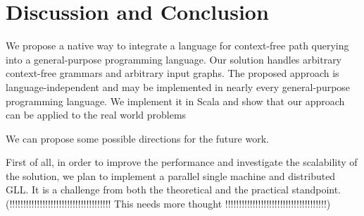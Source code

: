 \section{Discussion and Conclusion}
\label{sec:conclusion}

We propose a native way to integrate a language for context-free path querying into a general-purpose programming language.
Our solution handles arbitrary context-free grammars and arbitrary input graphs.
The proposed approach is language-independent and may be implemented in nearly every general-purpose programming language.
We implement it in Scala and show that our approach can be applied to the real world problems


We can propose some possible directions for the future work.

%
First of all, in order to improve the performance and investigate the scalability of the solution, we plan to implement a parallel single machine and distributed GLL. 
It is a challenge from both the theoretical and the practical standpoint. (!!!!!!!!!!!!!!!!!!!!!!!!!!!!!!!!!!!!! This needs more thought !!!!!!!!!!!!!!!!!!!!!!!!!!!!!!!!!!!!!)


